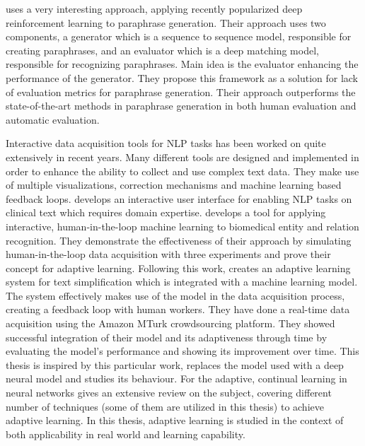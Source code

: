 \cite{Lietal} uses a very interesting approach, applying recently popularized deep reinforcement learning to paraphrase generation. Their approach uses two components, a generator which is a sequence to sequence model, responsible for creating paraphrases, and an evaluator which is a deep matching model, responsible for recognizing paraphrases. Main idea is the evaluator enhancing the performance of the generator. They propose this framework as a solution for lack of evaluation metrics for paraphrase generation. Their approach outperforms the state-of-the-art methods in paraphrase generation in both human evaluation and automatic evaluation.

Interactive data acquisition tools for NLP tasks has been worked on quite extensively in recent years. Many different tools are designed and implemented in order to enhance the ability to collect and use complex text data. They make use of multiple visualizations, correction mechanisms and machine learning based feedback loops. \cite{trivedi} develops an interactive user interface for enabling NLP tasks on clinical text which requires domain expertise. \cite{Yimam:2016aa} develops a tool for applying interactive, human-in-the-loop machine learning to biomedical entity and relation recognition. They demonstrate the effectiveness of their approach by simulating human-in-the-loop data acquisition with three experiments and prove their concept for adaptive learning. Following this work, \cite{par4sim} creates an adaptive learning system for text simplification which is integrated with a machine learning model. The system effectively makes use of the model in the data acquisition process, creating a feedback loop with human workers. They have done a real-time data acquisition using the Amazon MTurk crowdsourcing platform. They showed successful integration of their model and its adaptiveness through time by evaluating the model's performance and showing its improvement over time. This thesis is inspired by this particular work, replaces the model used with a deep neural model and studies its behaviour. For the adaptive, continual learning in neural networks \cite{parisi} gives an extensive review on the subject, covering different number of techniques (some of them are utilized in this thesis) to achieve adaptive learning. In this thesis, adaptive learning is studied in the context of both applicability in real world and learning capability.

